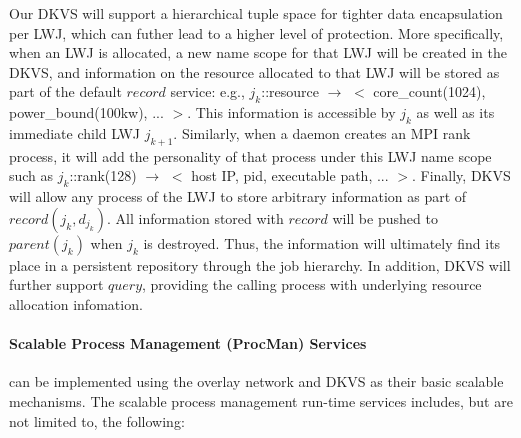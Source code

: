 Our DKVS will support a hierarchical tuple space for tighter
data encapsulation per LWJ, which can futher lead to a higher level of 
protection.
More specifically, when an LWJ is
allocated, a new name scope for that LWJ will be
created in the DKVS, and information on the resource allocated
to that LWJ will be stored as part of the default $record$ service: e.g.,
$j_k$::resource $\rightarrow$ $<$ core\_count(1024), power\_bound(100kw), ... $>$.
This information is accessible by $j_k$ as well as
its immediate child LWJ $j_{k+1}$.
Similarly, when a daemon creates an MPI rank process, it will add the
personality of that process under this LWJ name scope
such as $j_k$::rank(128) $\rightarrow$ $<$ host IP, pid, executable path, ... $>$.
Finally, DKVS will allow any process of the LWJ to store arbitrary information
as part of $record(j_k, d_{j_k})$. All information stored
with $record$ will be pushed to $parent(j_k)$ when $j_k$
is destroyed. Thus, the information will ultimately find its place
in a persistent repository through the job hierarchy. In addition,
DKVS will further support $query$, providing the calling process
with underlying resource allocation infomation.

\paragraph{Scalable Process Management (ProcMan) Services}
\label{sect:procman}
can be implemented using the overlay network and DKVS as their 
basic scalable mechanisms. The scalable process management 
run-time services includes, but are not limited to, the following:

